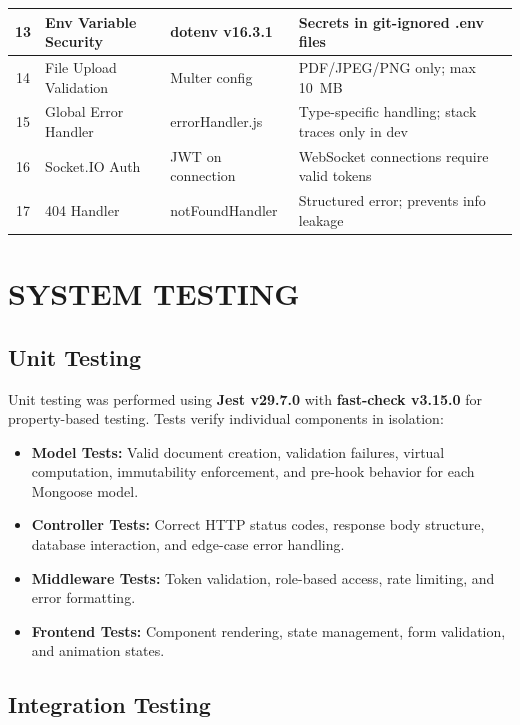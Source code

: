 \documentclass[12pt,a4paper,oneside]{report}
\begin{document}
\begin{longtable}{|c|p{3.2cm}|p{3cm}|p{5.5cm}|}
\hline
13 & Env Variable Security  & dotenv v16.3.1        & Secrets in git-ignored .env files \\
\hline\rowcolor{tableRow}
14 & File Upload Validation & Multer config         & PDF/JPEG/PNG only; max 10~MB \\
\hline
15 & Global Error Handler   & errorHandler.js       & Type-specific handling; stack traces only in dev \\
\hline\rowcolor{tableRow}
16 & Socket.IO Auth         & JWT on connection     & WebSocket connections require valid tokens \\
\hline
17 & 404 Handler            & notFoundHandler       & Structured error; prevents info leakage \\
\hline
\end{longtable}


\chapter{SYSTEM TESTING}

\section{Unit Testing}

Unit testing was performed using \textbf{Jest v29.7.0} with \textbf{fast-check v3.15.0} for property-based testing. Tests verify individual components in isolation:

\begin{itemize}[leftmargin=*]
  \item \textbf{Model Tests:} Valid document creation, validation failures, virtual computation, immutability enforcement, and pre-hook behavior for each Mongoose model.
  \item \textbf{Controller Tests:} Correct HTTP status codes, response body structure, database interaction, and edge-case error handling.
  \item \textbf{Middleware Tests:} Token validation, role-based access, rate limiting, and error formatting.
  \item \textbf{Frontend Tests:} Component rendering, state management, form validation, and animation states.
\end{itemize}

\section{Integration Testing}
\end{document}
